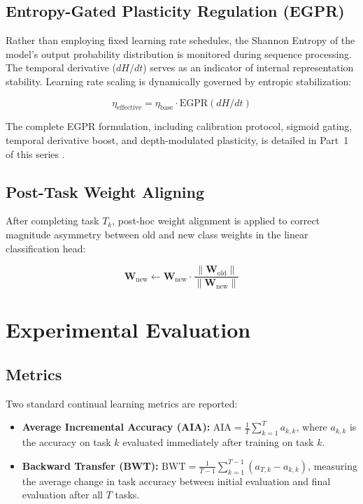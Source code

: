 \documentclass[11pt,a4paper]{article}
\begin{document}
\subsection{Entropy-Gated Plasticity Regulation (EGPR)}

Rather than employing fixed learning rate schedules, the Shannon Entropy of the model's output probability distribution is monitored during sequence processing. The temporal derivative ($dH/dt$) serves as an indicator of internal representation stability. Learning rate scaling is dynamically governed by entropic stabilization:

\begin{equation}
\eta_{\text{effective}} = \eta_{\text{base}} \cdot \text{EGPR}(dH/dt)
\end{equation}

The complete EGPR formulation, including calibration protocol, sigmoid gating, temporal derivative boost, and depth-modulated plasticity, is detailed in Part~1 of this series \citep{lemos2026egpr}.

\subsection{Post-Task Weight Aligning}

After completing task $T_k$, post-hoc weight alignment \citep{zhao2020maintaining} is applied to correct magnitude asymmetry between old and new class weights in the linear classification head:

\begin{equation}
\mathbf{W}_{\text{new}} \leftarrow \mathbf{W}_{\text{new}} \cdot \frac{\|\mathbf{W}_{\text{old}}\|}{\|\mathbf{W}_{\text{new}}\|}
\end{equation}

\section{Experimental Evaluation}

\subsection{Metrics}

Two standard continual learning metrics are reported:

\begin{itemize}
    \item \textbf{Average Incremental Accuracy (AIA):} $\text{AIA} = \frac{1}{T}\sum_{k=1}^{T} a_{k,k}$, where $a_{k,k}$ is the accuracy on task $k$ evaluated immediately after training on task $k$.
    \item \textbf{Backward Transfer (BWT):} $\text{BWT} = \frac{1}{T-1}\sum_{k=1}^{T-1} (a_{T,k} - a_{k,k})$, measuring the average change in task accuracy between initial evaluation and final evaluation after all $T$ tasks.
\end{itemize}
\end{document}
